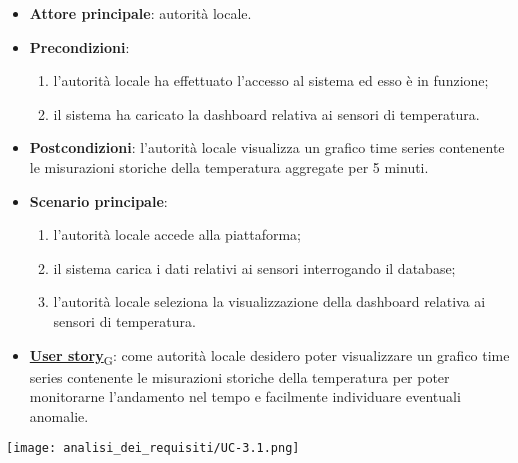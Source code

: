 \begin{itemize}
	\item \textbf{Attore principale}: autorità locale.
	\item \textbf{Precondizioni}:
	      \begin{enumerate}
		      \item l'autorità locale ha effettuato l'accesso al sistema ed esso è in funzione;
		      \item il sistema ha caricato la dashboard relativa ai sensori di temperatura.
	      \end{enumerate}
	\item \textbf{Postcondizioni}: l'autorità locale visualizza un grafico time series contenente le misurazioni storiche
	      della temperatura aggregate per 5 minuti.
	\item \textbf{Scenario principale}:
	      \begin{enumerate}
		      \item l'autorità locale accede alla piattaforma;
		      \item il sistema carica i dati relativi ai sensori interrogando il database;
		      \item l'autorità locale seleziona la visualizzazione della dashboard relativa ai sensori di temperatura.
	      \end{enumerate}
	\item \href{https://7last.github.io/docs/rtb/documentazione-interna/glossario\#user-story}{\textbf{User story}\textsubscript{G}}: come autorità locale desidero poter visualizzare un grafico time series contenente le misurazioni storiche della temperatura
	      per poter monitorarne l'andamento nel tempo e facilmente individuare eventuali anomalie.
\end{itemize}
\begin{center}
	\texttt{[image: analisi\_dei\_requisiti/UC-3.1.png]}
\end{center}


